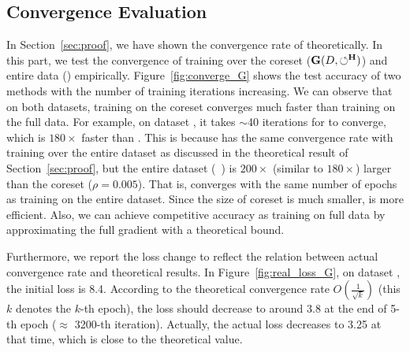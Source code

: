 \vspace{-0.5em}
\subsection{Convergence Evaluation}

In Section~\ref{sec:proof}, we have shown  the convergence rate of \ours theoretically. In this part, we test the convergence of training over the coreset ($\mathbf{G}(D,\circlearrowleft^\mathbf{H})$) and entire data (\truth) empirically.  Figure~\ref{fig:converge_G} shows the test accuracy of two methods with the number of training iterations increasing. We can observe that on both datasets, training on the coreset converges much faster than training on the full data. 
For example, on dataset \adult, it takes $\sim$40 iterations for \ours to converge, which is  $180\times$ faster than {\truth}. This is because \ours has the same convergence rate with training over the entire dataset as discussed in the theoretical result of Section~\ref{sec:proof}, but the entire dataset (\eg  ~\adult) is $200\times$ (similar to $180\times$) larger than the coreset ($\rho=0.005$).
 That is, \ours converges with the same number of epochs  as training on the entire dataset. Since the size of coreset is much smaller, \ours is more efficient. Also, we can achieve competitive accuracy as training on full data by approximating the full gradient with a theoretical bound. 
 

Furthermore, we report the loss change to reflect the relation between  actual convergence rate and theoretical results. In Figure~\ref{fig:real_loss_G}, on dataset \hr, the initial loss is 8.4. According to the theoretical convergence rate $O(\frac{1}{\sqrt{k}})$ (this $k$ denotes the $k$-th epoch),  the loss should decrease to around 3.8 at the end of 5-th epoch ($\approx$ 3200-th iteration). Actually,  the  actual loss decreases to 3.25 at that time, which is close to the theoretical value.

 


